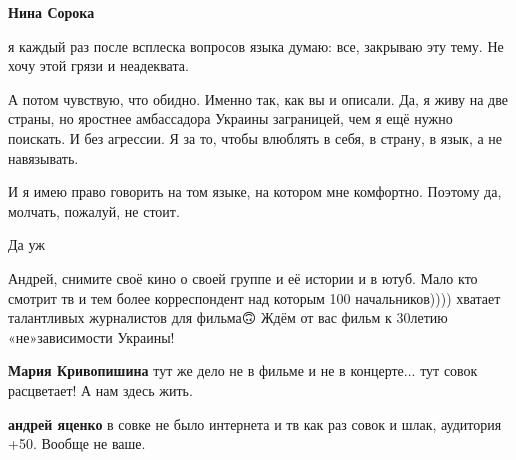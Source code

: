 \begin{itemize}
\begin{itemize}
\textbf{Нина Сорока} 

я каждый раз после всплеска вопросов языка думаю: все, закрываю эту тему. Не
хочу этой грязи и неадеквата.

А потом чувствую, что обидно. Именно так, как вы и описали. Да, я живу на две
страны, но яростнее амбассадора Украины заграницей, чем я ещё нужно поискать. И
без агрессии. Я за то, чтобы влюблять в себя, в страну, в язык, а не
навязывать.

И я имею право говорить на том языке, на котором мне комфортно. Поэтому да,
молчать, пожалуй, не стоит.

\end{itemize}

 
Да уж

 

Андрей, снимите своё кино о своей группе и её истории и в ютуб. Мало кто
смотрит тв и тем более корреспондент над которым 100 начальников)))) хватает
талантливых журналистов для фильма🙃 Ждём от вас фильм к 30летию
«не»зависимости Украины!💪🏻

\begin{itemize}
 
\textbf{Мария Кривопишина} тут же дело не в фильме и не в концерте... тут совок расцветает! А нам здесь жить.

 
\textbf{андрей яценко} в совке не было интернета и тв как раз совок и шлак, аудитория +50. Вообще не ваше.


\end{itemize}
\end{itemize}
